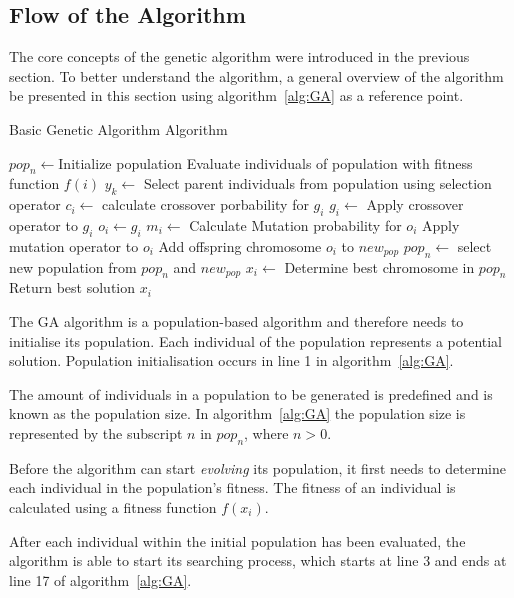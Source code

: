 \subsection{Flow of the Algorithm}
The core concepts of the genetic algorithm were introduced in the previous section. To better understand the algorithm, a general overview of the algorithm be presented in this section using algorithm~\ref{alg:GA} as a reference point.
\begin{algorithm}[H]
\caption{Basic Genetic Algorithm Algorithm\cite{FamilyGA,AdaptiveSAGA,DistributedHierarchicalGA,SelfAdaptiveGA}}
\label{alg:GA}
	\begin{algorithmic}[1]
		\State $pop_n\leftarrow$Initialize population
		\State Evaluate individuals of population with fitness function $f(i)$
		\State $y_k \leftarrow$ Select parent individuals from population using selection operator
		\Repeat
				\State $c_i \leftarrow$ calculate crossover porbability for $g_i$
					\State $g_i \leftarrow$ Apply crossover operator to $g_i$
				\EndIf
				\State $o_i \leftarrow g_i$
				\State $m_i\leftarrow$ Calculate Mutation probability for $o_i$
					\State Apply mutation operator to $o_i$
				\EndIf
				\State Add offspring chromosome $o_i$ to $new_{pop}$
			\EndFor
		\State $pop_n \leftarrow$ select new population from $pop_n$ and $new_{pop}$
		\EndWhile
		\State $x_i \leftarrow$ Determine best chromosome in $pop_n$
		\State Return best solution $x_i$
	\end{algorithmic}
\end{algorithm}
The \gls{GA} algorithm is a population-based algorithm and therefore needs to initialise its population. Each individual of the population represents a potential solution. Population initialisation occurs in line 1 in algorithm~\ref{alg:GA}. 

The amount of individuals in a population to be generated is predefined and is known as the population size. In algorithm~\ref{alg:GA} the population size is represented by the subscript $n$ in $pop_n$, where $n > 0$.

Before the algorithm can start \emph{evolving} its population, it first needs to determine each individual in the population's fitness. The fitness of an individual is calculated using a fitness function $f(x_i)$.

After each individual within the initial population has been evaluated, the algorithm is able to start its searching process, which starts at line 3 and ends at line 17 of algorithm~\ref{alg:GA}.

